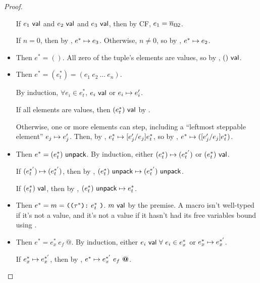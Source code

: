 \documentclass{article}
\begin{document}
\begin{proof}
\begin{itemize}
            If $e_1 ~\mathsf{val}$ and $e_2 ~\mathsf{val}$ and $e_3 ~\mathsf{val}$, then by CF, $e_1 = \overline{n}_{\mathsf{I32}}$.
            
            If $n = 0$, then by , $e^* \mapsto e_3$.
            Otherwise, $n \neq 0$, so by , $e^* \mapsto e_2$.
        
        \item {}
            Then $e^* = ()$. All zero of the tuple's elements are values, so by , $() ~\mathsf{val}$.
        
        \item {}
            Then $e^* = (e^*_t) = (e_1~ e_2~ ...~ e_n)$.
            
            By induction, $\forall e_i \in e^*_t$, $e_i ~\mathsf{val}$ or $e_i \mapsto e_i'$.
            
            If all elements are values, then $(e^*_t) ~\mathsf{val}$ by .
            
            Otherwise, one or more elements can step, including a ``leftmost steppable element'' $e_j \mapsto e_j'$.
            Then, by , $e^*_t \mapsto [e_j' / e_j] e^*_t$, so by , $e^* \mapsto ([e_j' / e_j] e^*_t)$.
            
        \item {}
            Then $e^* = (e^*_t) ~ \mathsf{unpack}$.
            By induction, either $(e^*_t) \mapsto (e^{*'}_t)$ or $(e^*_t) ~\mathsf{val}$.
            
            If $(e^{*'}_t) \mapsto (e^{*'}_t)$, then by , $(e^*_t) ~ \mathsf{unpack} \mapsto (e^{*'}_t) ~ \mathsf{unpack}$.
            
            If $(e^*_t) ~\mathsf{val}$, then by , $(e^*_t) ~ \mathsf{unpack} \mapsto e^*_t$.
        
        \item {}
            Then $e^* = m = \texttt{((} \tau^* \texttt{):} ~ e^*_t ~ \texttt{)}$. $m ~\mathsf{val}$ by the premise. A macro isn't well-typed if it's not a value, and it's not a value if it hasn't had its free variables bound using .
        
        \item {}
            Then $e^* = e^*_x~ e_f~ \textbf{@}$. By induction, either $e_i ~\mathsf{val}~ \forall~ e_i \in e^*_x$ or $e^*_x \mapsto e^{*'}_x$.
            
            If $e^*_x \mapsto e^{*'}_x$, then by , $e^* \mapsto e^{*'}_x~ e_f~ \textbf{@}$.
            

\end{itemize}
\end{proof}
\end{document}
